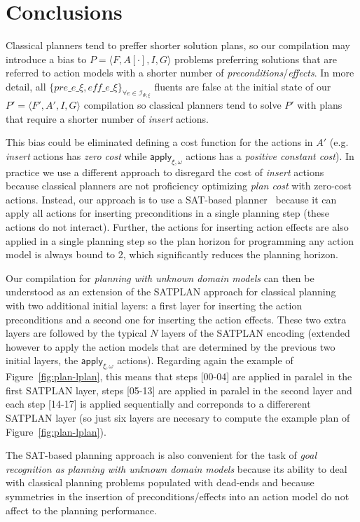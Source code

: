 \documentclass[letterpaper]{article} %
\newcommand{\tup}[1]{{\langle #1 \rangle}}
\begin{document}
\section{Conclusions}
\label{sec:conclusions}
Classical planners tend to preffer shorter solution plans, so our compilation may introduce a bias to $P=\tup{F,A[\cdot],I,G}$ problems preferring solutions that are referred to action models with a shorter number of {\em preconditions}/{\em effects}. In more detail, all $\{pre\_e\_\xi, eff\_e\_\xi\}_{\forall e\in{\mathcal I}_{\Psi,\xi}}$ fluents are false at the initial state of our $P'=\tup{F',A',I,G}$ compilation so classical planners tend to solve $P'$ with plans that require a shorter number of {\em insert} actions.

This bias could be eliminated defining a cost function for the actions in $A'$ (e.g. {\em insert} actions has {\em zero cost} while $\mathsf{apply_{\xi,\omega}}$ actions has a {\em positive constant cost}). In practice we use a different approach to disregard the cost of {\em insert} actions because classical planners are not proficiency optimizing {\em plan cost} with zero-cost actions. Instead, our approach is to use a SAT-based planner~\cite{rintanen2014madagascar} because it can apply all actions for inserting preconditions in a single planning step (these actions do not interact). Further, the actions for inserting action effects are also applied in a single planning step so the plan horizon for programming any action model is always bound to 2, which significantly reduces the planning horizon.

Our compilation for {\em planning with unknown domain models} can then be understood as an extension of the SATPLAN approach for classical planning~\cite{kautz1992planning} with two additional initial layers: a first layer for inserting the action preconditions and a second one for inserting the action effects. These two extra layers are followed by the typical $N$ layers of the SATPLAN encoding (extended however to apply the action models that are determined by the previous two initial layers, the $\mathsf{apply_{\xi,\omega}}$ actions). Regarding again the example of Figure~\ref{fig:plan-lplan}, this means that steps [00-04] are applied in paralel in the first SATPLAN layer, steps [05-13] are applied in paralel in the second layer and each step [14-17] is applied sequentially and correponds to a differerent SATPLAN layer (so just six layers are necesary to compute the example plan of Figure~\ref{fig:plan-lplan}).

The SAT-based planning approach is also convenient for the task of {\em goal recognition as planning with unknown domain models} because its ability to deal with classical planning problems populated with dead-ends and because symmetries in the insertion of preconditions/effects into an action model do not affect to the planning performance.
\end{document}
